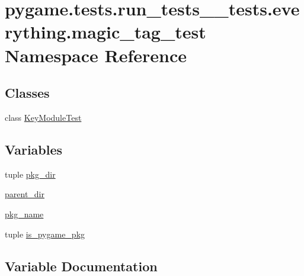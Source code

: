 \hypertarget{namespacepygame_1_1tests_1_1run__tests____tests_1_1everything_1_1magic__tag__test}{}\section{pygame.\+tests.\+run\+\_\+tests\+\_\+\+\_\+tests.\+everything.\+magic\+\_\+tag\+\_\+test Namespace Reference}
\label{namespacepygame_1_1tests_1_1run__tests____tests_1_1everything_1_1magic__tag__test}
\subsection*{Classes}
\begin{DoxyCompactItemize}
\item 
class \hyperlink{classpygame_1_1tests_1_1run__tests____tests_1_1everything_1_1magic__tag__test_1_1_key_module_test}{Key\+Module\+Test}
\end{DoxyCompactItemize}
\subsection*{Variables}
\begin{DoxyCompactItemize}
\item 
tuple \hyperlink{namespacepygame_1_1tests_1_1run__tests____tests_1_1everything_1_1magic__tag__test_aa711d77ae15da0152ee9a55cf2034e18}{pkg\+\_\+dir}
\item 
\hyperlink{namespacepygame_1_1tests_1_1run__tests____tests_1_1everything_1_1magic__tag__test_a9d10928be727dbf6471e3e01fbbe5bdd}{parent\+\_\+dir}
\item 
\hyperlink{namespacepygame_1_1tests_1_1run__tests____tests_1_1everything_1_1magic__tag__test_a0b9d6b566b69bd7f6c87c28f0e8816b5}{pkg\+\_\+name}
\item 
tuple \hyperlink{namespacepygame_1_1tests_1_1run__tests____tests_1_1everything_1_1magic__tag__test_a697dd1fceab09677915e09b70ea86664}{is\+\_\+pygame\+\_\+pkg}
\end{DoxyCompactItemize}


\subsection{Variable Documentation}
\mbox{\label{namespacepygame_1_1tests_1_1run__tests____tests_1_1everything_1_1magic__tag__test_a697dd1fceab09677915e09b70ea86664}} 
